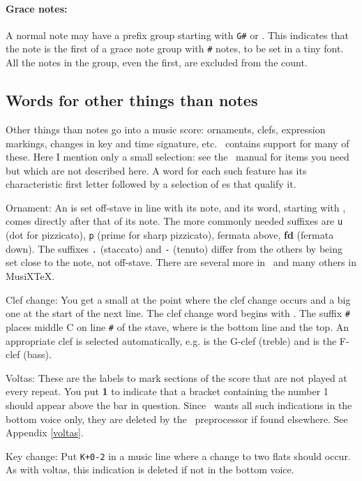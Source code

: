 \documentclass[11pt]{article}
\begin{document}
\paragraph*{Grace notes:} A normal note may have a prefix group starting
with \verb"G#" or .  This indicates that the note is the first 
of a grace note 
group with \verb"#" notes, to be set in a tiny font.   
All the notes in the group, even the first, are excluded from the 
count. 

\subsection{Words for other things than notes}  \label{ornaments}

Other things than notes go into a music score: ornaments, 
clefs,                                          
expression markings, changes in key and time signature, etc.  
\PMX\ contains support for many of these.  Here I mention only a small 
selection: see the \PMX\ manual for items you need but which are not 
described here.  A word for each such feature has its characteristic 
first letter followed by a selection of es that qualify it.

\begin{description}
 \item{Ornament:}  An  is set off-stave in line with its note, 
and its word, starting with , comes directly after that of its 
note.   The more commonly needed suffixes are           
\texttt{u} (dot for 
pizzicato), \texttt{p} (\mark prime for sharp pizzicato), 
\mark fermata above, \textbf{fd} (\mark fermata \mark down). 
The suffixes \texttt{.} (staccato) and
\texttt{-} (tenuto) differ from the others by being set close to the
note, not off-stave.
There are several more in \PMX\ and many others in MusiX\TeX. 
 \item{Clef change:}  You get a small  at the point where 
the clef change occurs and a big one at the start of the next line.
The clef change word begins with .  The suffix \verb"#" places 
middle C on line \verb"#" of the stave, where  is the bottom 
line and  the top.  An appropriate clef is selected 
automatically, e.g.  is the G-clef (treble) and  is 
the F-clef (bass). 
 \item{Voltas:}   These are the labels to mark sections of the score
that are not played at every repeat.  You put \textbf{1} to indicate
that a bracket containing the number 1 should appear above the bar
in question.  Since \PMX\ wants all such indications in the bottom
voice only, they are deleted by the \MTx\ preprocessor if found
elsewhere.   See Appendix \ref{voltas}.
 \item{Key change:} Put \verb'K+0-2' in a music line where a  change
to two flats should occur.  As with voltas, this indication is deleted
if not in the bottom voice.
\end{description}
\end{document}
